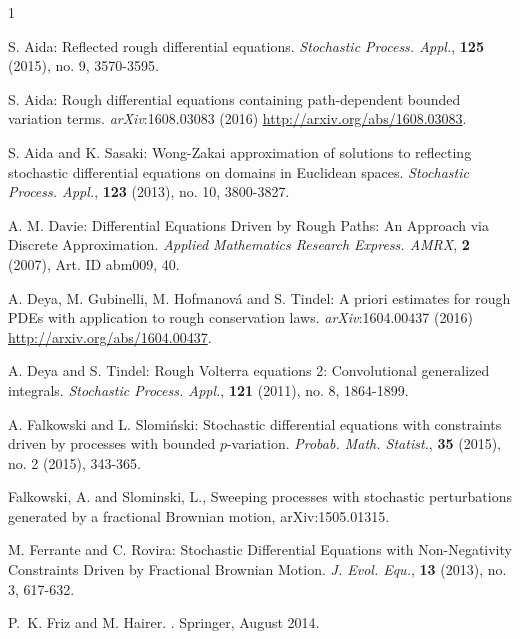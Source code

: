 \documentclass[11pt,reqno,oneside]{amsart}
\numberwithin{equation}{section}
\begin{document}
\begin{thebibliography}{1}

 S. Aida: Reflected rough differential equations. {\it Stochastic Process. Appl.}, {\bf 125} (2015), no. 9, 3570-3595.



 S. Aida: Rough differential equations containing path-dependent bounded variation terms. {\it arXiv}:1608.03083 (2016) \url{http://arxiv.org/abs/1608.03083}.




 S. Aida and K. Sasaki: Wong-Zakai approximation of solutions to reflecting stochastic differential equations on domains in Euclidean spaces. {\it Stochastic Process. Appl.}, {\bf 123} (2013), no. 10, 3800-3827.

 A. M. Davie: Differential Equations Driven by Rough Paths: An Approach via Discrete Approximation. {\it Applied Mathematics Research Express. AMRX}, {\bf 2} (2007), Art. ID abm009, 40.


 A. Deya, M. Gubinelli, M. Hofmanov{\'a} and S. Tindel: A priori estimates for rough PDEs with application to rough conservation laws. {\it arXiv}:1604.00437 (2016) \url{http://arxiv.org/abs/1604.00437}.



 A. Deya and S. Tindel: Rough Volterra equations 2: Convolutional generalized integrals. {\it Stochastic Process. Appl.}, {\bf 121} (2011), no. 8, 1864-1899.

 A. Falkowski and L. Slomi{\'n}ski: Stochastic differential equations with constraints driven by processes with bounded $p$-variation. {\it Probab. Math. Statist.}, {\bf 35} (2015), no. 2 (2015), 343-365.

 {Falkowski}, A. and {Slominski}, L.,
    {Sweeping processes with stochastic perturbations generated by a fractional Brownian motion},
 arXiv:1505.01315.


M. Ferrante and C. Rovira: Stochastic Differential Equations with Non-Negativity Constraints Driven by Fractional Brownian Motion. {\it J. Evol. Equ.}, {\bf 13} (2013), no. 3, 617-632. 


P.~K. Friz and M. Hairer.
.
\newblock Springer, August 2014.




\end{thebibliography}
\end{document}
